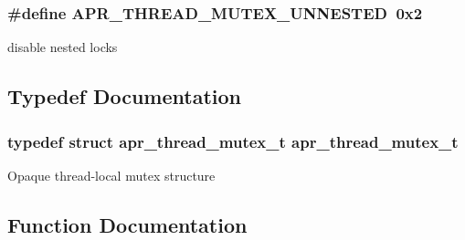 \subsubsection[{\texorpdfstring{A\+P\+R\+\_\+\+T\+H\+R\+E\+A\+D\+\_\+\+M\+U\+T\+E\+X\+\_\+\+U\+N\+N\+E\+S\+T\+ED}{APR_THREAD_MUTEX_UNNESTED}}]{\setlength{\rightskip}{0pt plus 5cm}\#define A\+P\+R\+\_\+\+T\+H\+R\+E\+A\+D\+\_\+\+M\+U\+T\+E\+X\+\_\+\+U\+N\+N\+E\+S\+T\+ED~0x2}\hypertarget{group__apr__thread__mutex_gac31107f3db115edc0c26ea48943c6a16}{}\label{group__apr__thread__mutex_gac31107f3db115edc0c26ea48943c6a16}
disable nested locks 

\subsection{Typedef Documentation}
\subsubsection[{\texorpdfstring{apr\+\_\+thread\+\_\+mutex\+\_\+t}{apr_thread_mutex_t}}]{\setlength{\rightskip}{0pt plus 5cm}typedef struct {\bf apr\+\_\+thread\+\_\+mutex\+\_\+t} {\bf apr\+\_\+thread\+\_\+mutex\+\_\+t}}\hypertarget{group__apr__thread__mutex_ga95712060ba3a192036416e1ccef1db75}{}\label{group__apr__thread__mutex_ga95712060ba3a192036416e1ccef1db75}
Opaque thread-\/local mutex structure 

\subsection{Function Documentation}

